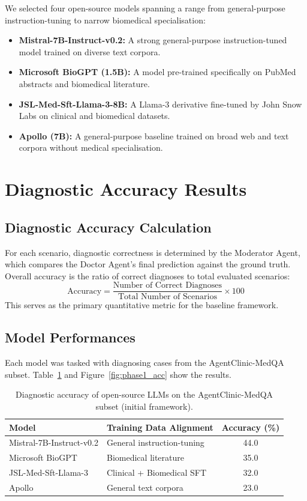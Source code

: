 We selected four open-source models spanning a range from general-purpose instruction-tuning to narrow biomedical specialisation:
\begin{itemize}
    \item \textbf{Mistral-7B-Instruct-v0.2:} A strong general-purpose instruction-tuned model trained on diverse text corpora.
    \item \textbf{Microsoft BioGPT (1.5B):} A model pre-trained specifically on PubMed abstracts and biomedical literature.
    \item \textbf{JSL-Med-Sft-Llama-3-8B:} A Llama-3 derivative fine-tuned by John Snow Labs on clinical and biomedical datasets.
    \item \textbf{Apollo (7B):} A general-purpose baseline trained on broad web and text corpora without medical specialisation.
\end{itemize}

\section{Diagnostic Accuracy Results}

\subsection{Diagnostic Accuracy Calculation}

For each scenario, diagnostic correctness is determined by the Moderator Agent, which compares the Doctor Agent's final prediction against the ground truth. Overall accuracy is the ratio of correct diagnoses to total evaluated scenarios:
\[
\text{Accuracy} = \frac{\text{Number of Correct Diagnoses}}{\text{Total Number of Scenarios}} \times 100
\]
This serves as the primary quantitative metric for the baseline framework.

\subsection{Model Performances}

Each model was tasked with diagnosing cases from the AgentClinic-MedQA subset. Table~\ref{tab:phase1_acc} and Figure~\ref{fig:phase1_acc} show the results.

\begin{table}[H]
\centering
\caption{Diagnostic accuracy of open-source LLMs on the AgentClinic-MedQA subset (initial framework).}
\label{tab:phase1_acc}
\begin{tabular}{@{}llc@{}}
\toprule
\textbf{Model} & \textbf{Training Data Alignment} & \textbf{Accuracy (\%)} \\ \midrule
Mistral-7B-Instruct-v0.2 & General instruction-tuning & 44.0 \\
Microsoft BioGPT         & Biomedical literature       & 35.0 \\
JSL-Med-Sft-Llama-3      & Clinical + Biomedical SFT   & 32.0 \\
Apollo                   & General text corpora        & 23.0 \\
\bottomrule
\end{tabular}
\end{table}

